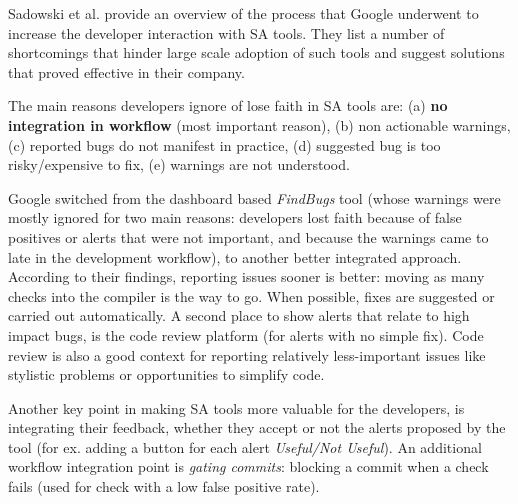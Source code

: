 \documentclass{article}
\begin{document}
 Sadowski et al. \cite{sa_google} provide an overview of the process that Google underwent to increase the developer interaction with SA tools. They list a number of shortcomings that hinder large scale adoption of such tools and suggest solutions that proved effective in their company. 

 The main reasons developers ignore of lose faith in SA tools are: (a) \textbf{no integration in workflow} (most important reason), (b) non actionable warnings, (c) reported bugs do not manifest in practice, (d) suggested bug is too risky/expensive to fix, (e) warnings are not understood.

 Google switched from the dashboard based \textit{FindBugs} tool (whose warnings were mostly ignored for two main reasons: developers lost faith because of false positives or alerts that were not important, and because the warnings came to late in the development workflow), to another better integrated approach.
 According to their findings, reporting issues sooner is better: moving as many checks into the compiler is the way to go. When possible, fixes are suggested or carried out automatically. A second place to show alerts that relate to high impact bugs, is the code review platform (for alerts with no simple fix). Code review is also a good context for reporting relatively less-important issues like stylistic problems or opportunities to simplify code.

 Another key point in making SA tools more valuable for the developers, is integrating their feedback, whether they accept or not the alerts proposed by the tool (for ex. adding a button for each alert \textit{Useful/Not Useful}).
 An additional workflow integration point is \textit{gating commits}: blocking a commit when a check fails (used for check with a low false positive rate).


\end{document}
